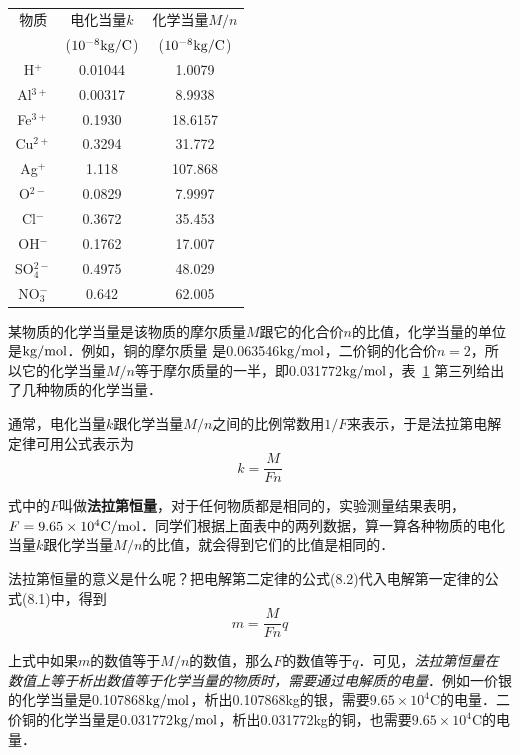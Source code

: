\begin{table}[htbp]
	\centering
	\caption{}\label{tab_B_8-1} 
	\begin{tabular}{ccc}
		\toprule
		物质  &  电化当量$k$  &  化学当量$M/n$\\
		& ($10^{-8}{\rm kg}/{\rm C}$)& ($10^{-8}{\rm kg}/{\rm C}$)\\
		\midrule
		H$^+$       &   0.01044    &  1.0079     \\
		Al$^{3+}$       &  0.00317     &    8.9938   \\
		Fe$^{3+}$       &  0.1930     &  18.6157     \\
		Cu$^{2+}$       &  0.3294     &   31.772    \\
		Ag$^{+}$       &   1.118    &   107.868    \\
		O$^{2-}$       &  0.0829     &   7.9997    \\
		Cl$^{-}$       &  0.3672     &   35.453    \\
		OH$^{-}$       &  0.1762     &  17.007     \\
		SO${}_4^{2-}$       &   0.4975    &  48.029     \\
		NO${}_3^{-}$       &  0.642     &  62.005     \\
		\bottomrule
	\end{tabular}
\end{table}

某物质的化学当量是该物质的摩尔质量$M$跟它的化合价$n$的比值，化学当量的单位是${\rm kg}/{\rm mol}$．例如，铜的摩尔质量
是0.063546${\rm kg}/{\rm mol}$，二价铜的化合价$n=2$，所以它的化学当量$M/n$等于摩尔质量的一半，即0.031772${\rm kg}/{\rm mol}$，表~\ref{tab_B_8-1} 第三列给出了几种物质的化学当量．

通常，电化当量$k$跟化学当量$M/n$之间的比例常数用$1/F$来表示，于是法拉第电解定律可用公式表示为
\begin{equation}
    k=\frac{M}{Fn}
\end{equation}

式中的$F$叫做\textbf{法拉第恒量}，对于任何物质都是相同的，实验测量结果表明，$F=9.65\times10^4{\rm C}/{\rm mol}$．同学们根据上面表中的两列数据，算一算各种物质的电化当量$k$跟化学当量$M/n$的比值，就会得到它们的比值是相同的．

法拉第恒量的意义是什么呢？把电解第二定律的公式(8.2)代入电解第一定律的公式(8.1)中，得到
\begin{equation}
    m=\frac{M}{Fn}q
\end{equation}

上式中如果$m$的数值等于$M/n$的数值，那么$F$的数值等于$q$．可见，\textit{法拉第恒量在数值上等于析出数值等于化学当量的物质时，需要通过电解质的电量}．例如一价银的化学当量是0.107868${\rm kg}/{\rm mol}$，析出0.107868kg的银，需要$9.65\times10^4$C的电量．二价铜的化学当量是0.031772${\rm kg}/{\rm mol}$，析出0.031772kg的铜，也需要$9.65\times10^4$C的电量．

